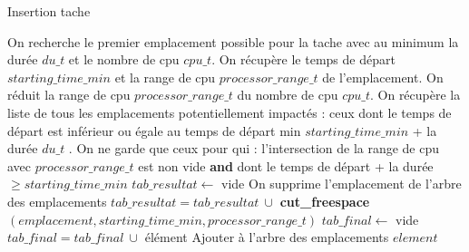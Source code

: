 \documentclass{report}
\begin{document}
\begin{algorithm}
\caption{Insertion tache}\label{insertion}
\begin{algorithmic}[1]
	\State
	\State On recherche le premier emplacement possible pour la tache avec au minimum la durée $du\_t$ et le nombre de cpu $cpu\_t$.
	\State
	\State On récupère le temps de départ $starting\_time\_min$ et la range de cpu $processor\_range\_t$ de l'emplacement.
	\State On réduit la range de cpu $processor\_range\_t$ du nombre de cpu $cpu\_t$.
	\State On récupère la liste de tous les emplacements potentiellement impactés : ceux dont le temps de départ est inférieur ou égale au temps de départ min $starting\_time\_min$ + la durée $du\_t$ .
	\State 		
	\State On ne garde que ceux pour qui :
	\State \hspace{\algorithmicindent} l'intersection de la range de cpu avec $processor\_range\_t$ est non vide
	\State \textbf{and}
	\State \hspace{\algorithmicindent} dont le temps de départ + la durée $\geq starting\_time\_min$
	\State
	\State $tab\_resultat \gets $ vide
	\State
		\State On supprime l'emplacement de l'arbre des emplacements
		\State $tab\_resultat = tab\_resultat\ \cup$ \textbf{cut\_freespace}$(emplacement, starting\_time\_min, processor\_range\_t)$
	\EndFor
	\State
	\State $tab\_final \gets $ vide
	\State
			\State $tab\_final = tab\_final\ \cup$ élément
		\EndIf
	\EndFor
	\State
		\State Ajouter à l'arbre des emplacements $element$
	\EndFor
	\State
\EndFunction
\end{algorithmic}
\end{algorithm}
\end{document}
